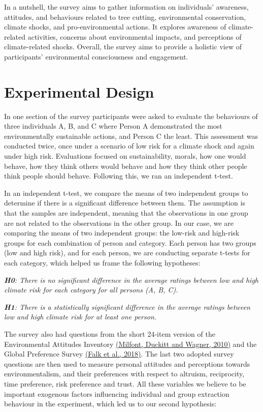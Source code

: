 \documentclass[11pt, a4paper, leqno]{article}
\begin{document}
In a nutshell, the survey aims to gather information on individuals' awareness, attitudes, and behaviours related to tree cutting, environmental conservation, climate shocks, and pro-environmental actions. It explores awareness of climate-related activities, concerns about environmental impacts, and perceptions of climate-related shocks. Overall, the survey aims to provide a holistic view of participants' environmental consciousness and engagement.

\section{Experimental Design} %
\label{sec:Data and Variables}
In one section of the survey participants were asked to evaluate the behaviours of three individuals A, B, and C where Person A demonstrated the most environmentally sustainable actions, and Person C the least. This assessment was conducted twice, once under a scenario of low risk for a climate shock and again under high risk. Evaluations
focused on sustainability, morals, how one would behave, how they think others would behave and how they think other people think people should behave. Following this, we ran an independent t-test. 

In an independent t-test, we compare the means of two independent groups to determine if there is a significant difference between them. The assumption is that the samples are independent, meaning that the observations in one group are not related to the observations in the other group.
In our case, we are comparing the means of two independent groups: the low-risk and high-risk groups for each combination of person and category. Each person has two groups (low and high risk), and for each person, we are conducting separate t-tests for each category, which helped us frame the following hypotheses:

\medskip
\begin{adjustbox}{minipage=.7\textwidth,margin=0pt \smallskipamount,center}
    \itshape \noindent \textbf{H0}: There is no significant difference in the average ratings between low and high climate risk for each category for all persons (A, B, C).
    
    \itshape \noindent \textbf{H1}: There is a statistically significant difference in the average ratings between low and high climate risk for at least one person.
\end{adjustbox}
\medskip

The survey also had questions from the short 24-item version of the Environmental Attitudes Inventory \href{https://api.semanticscholar.org/CorpusID:59149978}{ (Milfont, Duckitt and Wagner, 2010)} and the Global Preference Survey \href{https://api.semanticscholar.org/CorpusID:34720979}{  (Falk et al., 2018)}. The last two adopted survey questions are then used to measure personal attitudes and perceptions towards environmentalism, and their preferences with respect to altruism, reciprocity, time preference, risk preference and trust. All these variables we believe to be important exogenous factors influencing individual and group extraction behaviour in the experiment, which led us to our second hypothesis:
\end{document}
